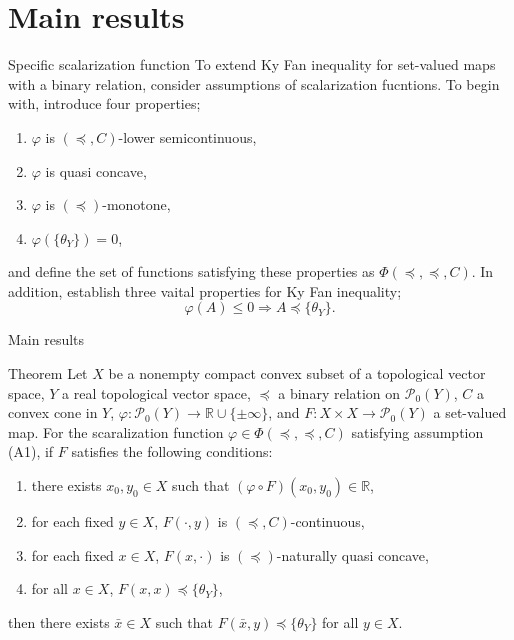 \documentclass[aspectratio=169, dvipdfmx, 11pt]{beamer}
\newcommand{\RealNumberSet}{\mathbb{R}}
\newcommand{\pow}[1]{\mathcal{P}_{0}(#1)}
\begin{document}
\section{Main results}

\begin{frame}{Specific scalarization function}
  To extend Ky Fan inequality for set-valued maps with a binary relation, consider assumptions of scalarization fucntions. To begin with, introduce four properties;
  \begin{enumerate}
    \item $\varphi$ is $(\preceq, C)$-lower semicontinuous,
    \item $\varphi$ is quasi concave,
    \item $\varphi$ is $(\preccurlyeq)$-monotone,
    \item $\varphi(\{\theta_{Y}\}) = 0$,
  \end{enumerate}
  and define the set of functions satisfying these properties as $\Phi(\preceq, \preccurlyeq, C)$. In addition, establish three vaital properties for Ky Fan inequality;
  \begin{equation}
    \varphi (A) \leq 0 \Rightarrow A \preccurlyeq \{\theta_{Y}\}. \tag*{(A1)}
  \end{equation}
\end{frame}

\begin{frame}{Main results}
  \begin{block}{Theorem}
    Let $X$ be a nonempty compact convex subset of a topological vector space,
    $Y$ a real topological vector space, $\preccurlyeq$ a binary relation on $\pow{Y}$,
    $C$ a convex cone in $Y$, $\varphi\colon \pow{Y} \to \RealNumberSet \cup \{\pm \infty\}$,
    and $F\colon X \times X \to \pow{Y} $ a set-valued map.
    For the scaralization function $\varphi \in \Phi(\preceq, \preccurlyeq, C)$ satisfying assumption (A1),
    if $F$ satisfies the following conditions:
    \begin{enumerate}
      \item there exists $x_0, y_0 \in X$ such that $(\varphi \circ F)(x_0,y_0) \in \RealNumberSet$,
      \item for each fixed $y \in X$, $F(\cdot,y)$ is $(\preceq, C)$-continuous,
      \item for each fixed $x \in X$, $F(x,\cdot)$ is $(\preccurlyeq)$-naturally quasi concave,
      \item for all $x \in X$, $F(x,x) \preccurlyeq \{\theta_{Y}\}$,
    \end{enumerate}
    then there exists $\bar{x} \in X$ such that $ F(\bar{x},y) \preccurlyeq \{\theta_{Y}\} $ for all $y \in X$.
  \end{block}
\end{frame}
\end{document}
